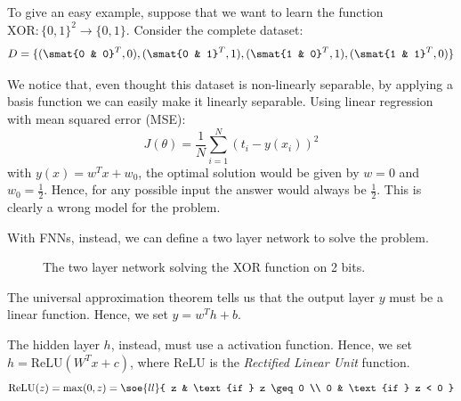\documentclass[a4paper, 12pt]{report}
\begin{document}
    To give an easy example, suppose that we want to learn the function $\mathrm{XOR} : \{0,1\}^2 \to \{0,1\}$. Consider the complete dataset:
    \[D = \{(\smat{0 & 0}^T, 0), (\smat{0 & 1}^T, 1), (\smat{1 & 0}^T, 1), (\smat{1 & 1}^T, 0)\}\]

    We notice that, even thought this dataset is non-linearly separable, by applying a basis function we can easily make it linearly separable. Using linear regression with mean squared error (MSE):
    \[J(\theta) = \frac{1}{N} \sum_{i = 1}^N (t_i - y(x_i))^2\]
    with $y(x) = w^Tx+w_0$, the optimal solution would be given by $w = 0$ and $w_0 = \frac{1}{2}$. Hence, for any possible input the answer would always be $\frac{1}{2}$. This is clearly a wrong model for the problem.

    With FNNs, instead, we can define a two layer network to solve the problem.

    \begin{figure}[H]
        \centering

        \caption{The two layer network solving the XOR function on 2 bits.}
    \end{figure}

    The universal approximation theorem tells us that the output layer $y$ must be a linear function. Hence, we set $y = w^Th + b$.
    
    The hidden layer $h$, instead, must use a  activation function. Hence, we set $h = \mathrm{ReLU}(W^Tx+c)$, where $\mathrm{ReLU}$ is the \textit{Rectified Linear Unit} function.
    \[\mathrm{ReLU}(z) = \mathrm{max}(0,z) = \soe{ll}{
        z & \text{if } z \geq 0 \\
        0 & \text{if } z < 0
    }\]
\end{document}
